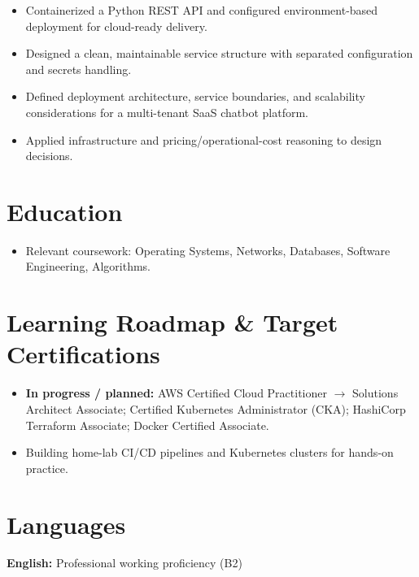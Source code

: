 \documentclass[10pt]{article}
\begin{document}
\begin{itemize}
  \item Containerized a Python REST API and configured environment-based deployment for cloud-ready delivery.
  \item Designed a clean, maintainable service structure with separated configuration and secrets handling.
\end{itemize}

\begin{itemize}
  \item Defined deployment architecture, service boundaries, and scalability considerations for a multi-tenant SaaS chatbot platform.
  \item Applied infrastructure and pricing/operational-cost reasoning to design decisions.
\end{itemize}

\section{Education}
\begin{itemize}
  \item Relevant coursework: Operating Systems, Networks, Databases, Software Engineering, Algorithms.
\end{itemize}

\section{Learning Roadmap \& Target Certifications}
\begin{itemize}
  \item \textbf{In progress / planned:} AWS Certified Cloud Practitioner $\rightarrow$ Solutions Architect Associate; Certified Kubernetes Administrator (CKA); HashiCorp Terraform Associate; Docker Certified Associate.
  \item Building home-lab CI/CD pipelines and Kubernetes clusters for hands-on practice.
\end{itemize}

\section{Languages}
 \quad\textbullet\quad \textbf{English:} Professional working proficiency (B2)
\end{document}
